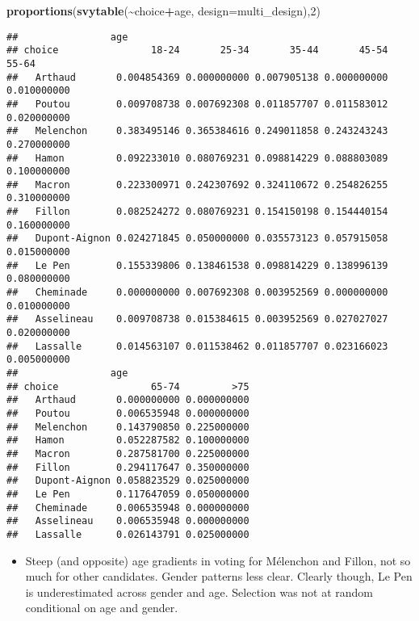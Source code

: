 \documentclass[
]{article}
\newenvironment{Shaded}{\begin{snugshade}}{\end{snugshade}}
\newcommand{\AttributeTok}[1]{\textcolor[rgb]{0.13,0.29,0.53}{#1}}
\newcommand{\DecValTok}[1]{\textcolor[rgb]{0.00,0.00,0.81}{#1}}
\newcommand{\FunctionTok}[1]{\textcolor[rgb]{0.13,0.29,0.53}{\textbf{#1}}}
\newcommand{\NormalTok}[1]{#1}
\newcommand{\SpecialCharTok}[1]{\textcolor[rgb]{0.81,0.36,0.00}{\textbf{#1}}}
\providecommand{\tightlist}{%
  \setlength{\itemsep}{0pt}\setlength{\parskip}{0pt}}
\begin{document}
\begin{Shaded}
\begin{Highlighting}[]
\FunctionTok{proportions}\NormalTok{(}\FunctionTok{svytable}\NormalTok{(}\SpecialCharTok{\textasciitilde{}}\NormalTok{choice}\SpecialCharTok{+}\NormalTok{age, }\AttributeTok{design=}\NormalTok{multi\_design),}\DecValTok{2}\NormalTok{)}
\end{Highlighting}
\end{Shaded}

\begin{verbatim}
##                age
## choice                18-24       25-34       35-44       45-54       55-64
##   Arthaud       0.004854369 0.000000000 0.007905138 0.000000000 0.010000000
##   Poutou        0.009708738 0.007692308 0.011857707 0.011583012 0.020000000
##   Melenchon     0.383495146 0.365384616 0.249011858 0.243243243 0.270000000
##   Hamon         0.092233010 0.080769231 0.098814229 0.088803089 0.100000000
##   Macron        0.223300971 0.242307692 0.324110672 0.254826255 0.310000000
##   Fillon        0.082524272 0.080769231 0.154150198 0.154440154 0.160000000
##   Dupont-Aignon 0.024271845 0.050000000 0.035573123 0.057915058 0.015000000
##   Le Pen        0.155339806 0.138461538 0.098814229 0.138996139 0.080000000
##   Cheminade     0.000000000 0.007692308 0.003952569 0.000000000 0.010000000
##   Asselineau    0.009708738 0.015384615 0.003952569 0.027027027 0.020000000
##   Lassalle      0.014563107 0.011538462 0.011857707 0.023166023 0.005000000
##                age
## choice                65-74         >75
##   Arthaud       0.000000000 0.000000000
##   Poutou        0.006535948 0.000000000
##   Melenchon     0.143790850 0.225000000
##   Hamon         0.052287582 0.100000000
##   Macron        0.287581700 0.225000000
##   Fillon        0.294117647 0.350000000
##   Dupont-Aignon 0.058823529 0.025000000
##   Le Pen        0.117647059 0.050000000
##   Cheminade     0.006535948 0.000000000
##   Asselineau    0.006535948 0.000000000
##   Lassalle      0.026143791 0.025000000
\end{verbatim}

\begin{itemize}
\tightlist
\item
  Steep (and opposite) age gradients in voting for Mélenchon and Fillon,
  not so much for other candidates. Gender patterns less clear. Clearly
  though, Le Pen is underestimated across gender and age. Selection was
  not at random conditional on age and gender.
\end{itemize}
\end{document}
